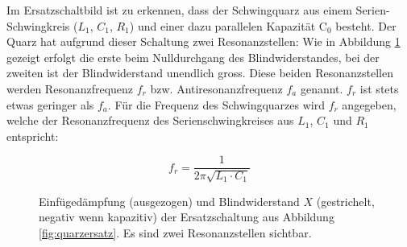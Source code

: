 \documentclass[twoside,a4paper,11pt,halfparskip,DIV=11,notitlepage]{scrartcl}
\newcommand{\uline}[1]{%
    \tikz[baseline=(todotted.base)]{
        \node[inner sep=1pt,outer sep=0pt] (todotted) {#1};
        \draw[color=HB9UFblue,thick] (todotted.south west) -- (todotted.south east);
    }%
}%
\newcommand{\udash}[1]{%
    \tikz[baseline=(todotted.base)]{
        \node[inner sep=1pt,outer sep=0pt] (todotted) {#1};
        \draw[dashed,color=HB9UFred,thick] (todotted.south west) -- (todotted.south east);
    }%
}%
\begin{document}
Im Ersatzschaltbild ist zu erkennen, dass der Schwingquarz aus einem Serien-Schwingkreis ($L_1$, $C_1$, $R_1$)
und einer dazu parallelen Kapazität C$_0$ besteht. Der Quarz hat aufgrund dieser Schaltung zwei Resonanzstellen:
Wie in Abbildung \ref{fig:quarzidealplot} gezeigt erfolgt die erste beim
Nulldurchgang des Blindwiderstandes, bei der zweiten ist der Blindwiderstand
unendlich gross. Diese beiden Resonanzstellen werden Resonanzfrequenz $f_r$
bzw. Antiresonanzfrequenz $f_a$ genannt. $f_r$ ist stets etwas geringer als
$f_a$. Für die Frequenz des Schwingquarzes wird $f_r$ angegeben, welche der
Resonanzfrequenz des Serienschwingkreises aus $L_1$, $C_1$ und $R_1$
entspricht:

$$
f_r = \frac{1}{2\pi\sqrt{L_1\cdot C_1}}
$$



\begin{figure}
\begin{center}
\end{center}
\caption{Einfügedämpfung (ausgezogen) und Blindwiderstand $X$ (gestrichelt, negativ wenn kapazitiv) der Ersatzschaltung
aus Abbildung \ref{fig:quarzersatz}. Es sind zwei Resonanzstellen sichtbar.}
\label{fig:quarzidealplot}
\end{figure}
\end{document}
